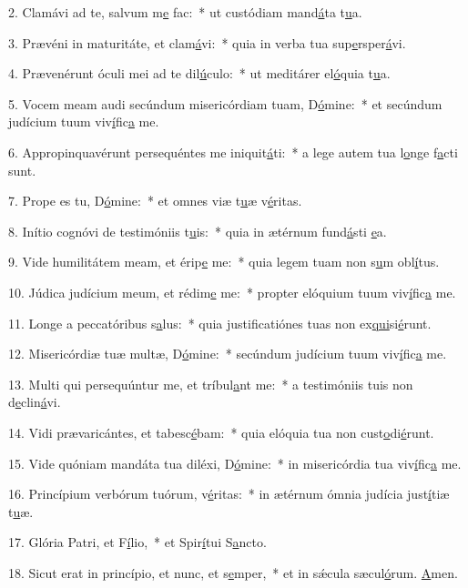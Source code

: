 2. Clamávi ad te, salvum m\uline{e} fac:~* ut custódiam mand\uline{á}ta t\uline{u}a.\par 
3. Prævéni in maturitáte, et clam\uline{á}vi:~* quia in verba tua sup\uline{e}rsper\uline{á}vi.\par 
4. Prævenérunt óculi mei ad te dil\uline{ú}culo:~* ut meditárer el\uline{ó}quia t\uline{u}a.\par 
5. Vocem meam audi secúndum misericórdiam tuam, D\uline{ó}mine:~* et secúndum judícium tuum viv\uline{í}fic\uline{a} me.\par 
6. Appropinquavérunt persequéntes me iniquit\uline{á}ti:~* a lege autem tua l\uline{o}nge f\uline{a}cti sunt.\par 
7. Prope es tu, D\uline{ó}mine:~* et omnes viæ t\uline{u}æ v\uline{é}ritas.\par 
8. Inítio cognóvi de testimóniis t\uline{u}is:~* quia in ætérnum fund\uline{á}sti \uline{e}a.\par 
9. Vide humilitátem meam, et érip\uline{e} me:~* quia legem tuam non s\uline{u}m obl\uline{í}tus.\par 
10. Júdica judícium meum, et rédim\uline{e} me:~* propter elóquium tuum viv\uline{í}fic\uline{a} me.\par 
11. Longe a peccatóribus s\uline{a}lus:~* quia justificatiónes tuas non ex\uline{qui}si\uline{é}runt.\par 
12. Misericórdiæ tuæ multæ, D\uline{ó}mine:~* secúndum judícium tuum viv\uline{í}fic\uline{a} me.\par 
13. Multi qui persequúntur me, et tríbul\uline{a}nt me:~* a testimóniis tuis non d\uline{e}clin\uline{á}vi.\par 
14. Vidi prævaricántes, et tabesc\uline{é}bam:~* quia elóquia tua non cust\uline{o}di\uline{é}runt.\par 
15. Vide quóniam mandáta tua diléxi, D\uline{ó}mine:~* in misericórdia tua viv\uline{í}fic\uline{a} me.\par 
16. Princípium verbórum tuórum, v\uline{é}ritas:~* in ætérnum ómnia judícia just\uline{í}tiæ t\uline{u}æ.\par 
17. Glória Patri, et F\uline{í}lio,~* et Spir\uline{í}tui S\uline{a}ncto.\par 
18. Sicut erat in princípio, et nunc, et s\uline{e}mper,~* et in sǽcula sæcul\uline{ó}rum. \uline{A}men.\par 
